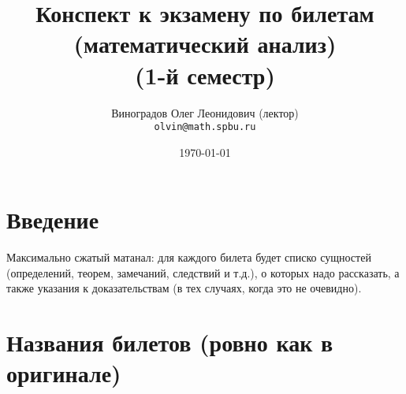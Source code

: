 \documentclass[12pt, a4paper]{article}
\title{Конспект к экзамену по билетам (математический анализ) \\(1-й семестр)}
\author{
  \vova
  \and
  Виноградов Олег Леонидович (лектор)\\
  \texttt{olvin@math.spbu.ru}
}
\date{\today}
\begin{document}
\maketitle
\newpage
\tableofcontents
\newpage


\section{Введение}

Максимально сжатый матанал: 
для каждого билета будет списко сущностей 
(определений, теорем, замечаний, следствий и т.д.),
о которых надо рассказать, а также указания к доказательствам
(в тех случаях, когда это не очевидно).

\section{Названия билетов (ровно как в оригинале)}
\end{document}
